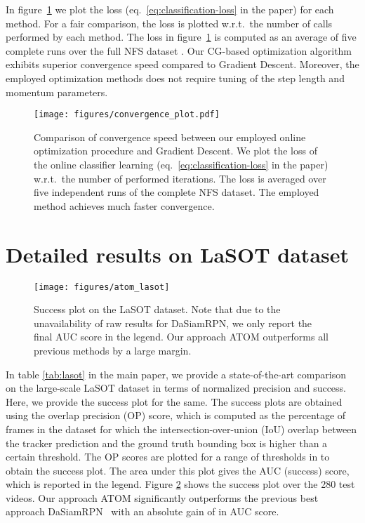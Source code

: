 \documentclass[10pt,twocolumn,letterpaper]{article}
\begin{document}
In figure~\ref{fig:convergence} we plot the loss (eq.\ \eqref{eq:classification-loss} in the paper) for each method. For a fair comparison, the loss is plotted w.r.t.\ the number of  calls performed by each method. The loss in figure~\ref{fig:convergence} is computed as an average of five complete runs over the full NFS dataset \cite{NfS}. Our CG-based optimization algorithm exhibits superior convergence speed compared to Gradient Descent. Moreover, the employed optimization methods does not require tuning of the step length and momentum parameters.

\begin{figure}[t]
	\centering
	\texttt{[image: figures/convergence\_plot.pdf]}\vspace{-1mm}
	\vspace{-3mm}
	\caption{Comparison of convergence speed between our employed online optimization procedure and Gradient Descent. We plot the loss of the online classifier learning (eq.\ \eqref{eq:classification-loss} in the paper) w.r.t.\ the number of performed  iterations. The loss is averaged over five independent runs of the complete NFS dataset. The employed method achieves much faster convergence.}
	\label{fig:convergence}
\end{figure}
	
\section{Detailed results on LaSOT dataset}

\begin{figure}[t]
	\centering \newcommand{\wid}{0.9\columnwidth}\texttt{[image: figures/atom\_lasot]}\vspace{-1.5mm}\caption{Success plot on the LaSOT dataset. Note that due to the unavailability of raw results for DaSiamRPN, we only report the final AUC score in the legend. Our approach ATOM outperforms all previous methods by a large margin.
	}\label{fig:lasot_success}\vspace{-1mm}\end{figure}

\label{sec:lasot}
In table \ref{tab:lasot} in the main paper, we provide a state-of-the-art comparison on the large-scale LaSOT dataset in terms of normalized precision and success. Here, we provide the success plot for the same. The success plots are obtained using the overlap precision (OP) score, which is computed as the percentage of frames in the dataset for which the intersection-over-union (IoU) overlap between the tracker prediction and the ground truth bounding box is higher than a certain threshold. The OP scores are plotted for a range of thresholds in  to obtain the success plot. The area under this plot gives the AUC (success) score, which is reported in the legend. Figure \ref{fig:lasot_success} shows the success plot over the 280 test videos. Our approach ATOM significantly outperforms the previous best approach DaSiamRPN~\cite{DaSiamRPN} with an absolute gain of  in AUC score.
\end{document}
